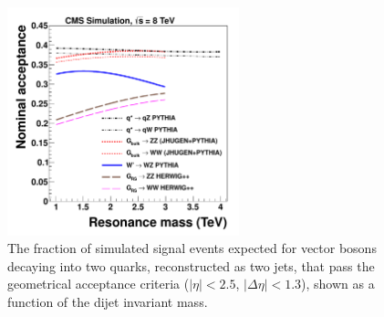 
\begin{figure}[htb]
\begin{center}
\includegraphics[width=0.6\textwidth]{EXO-12-024/figs/signal-acc-eff/all-signal-acc-8TeV.pdf}
\end{center}
\caption{
The fraction of simulated signal events expected for vector bosons decaying into two quarks,
reconstructed as two jets, that pass the geometrical acceptance criteria ($|\eta| < 2.5$, $|\Delta\eta|<1.3$), shown as a function of the dijet invariant mass.  }
\label{fig:acceptances}
\end{figure}


